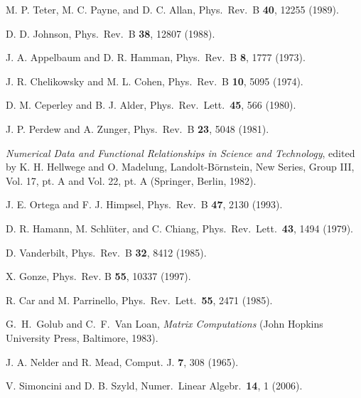 \documentclass[twocolumn,prb,showpacs,superscriptaddress]{revtex4}
\begin{document}
\begin{thebibliography}{99}
M. P. Teter, M. C. Payne, and D. C. Allan,
Phys.\ Rev.\ B {\bf 40}, 12255 (1989).

D. D. Johnson, 
Phys.\ Rev.\ B {\bf 38}, 12807 (1988).

J. A. Appelbaum and D. R. Hamman, 
Phys.\ Rev.\ B {\bf 8}, 1777 (1973).

J. R. Chelikowsky and M. L. Cohen,
Phys.\ Rev.\ B {\bf 10}, 5095 (1974).

D. M. Ceperley and B. J. Alder,
Phys.\ Rev.\ Lett.\ {\bf 45}, 566 (1980).

J. P. Perdew and A. Zunger,
Phys.\ Rev.\ B {\bf 23}, 5048 (1981).

{\it Numerical Data and Functional Relationships in Science and Technology}, 
edited by K. H. Hellwege and O. Madelung, Landolt-B\"ornstein, 
New Series, Group III, Vol. 17, pt. A and Vol. 22, pt. A (Springer, Berlin, 1982).

J. E. Ortega and F. J. Himpsel, 
Phys.\ Rev.\ B {\bf 47}, 2130 (1993).

D. R. Hamann, M. Schl\"uter, and C. Chiang,
Phys.\ Rev.\ Lett.\ {\bf 43}, 1494 (1979).

D. Vanderbilt, 
Phys.\ Rev.\ B {\bf 32}, 8412 (1985).

X. Gonze,
Phys.\ Rev. B {\bf 55}, 10337 (1997).

R. Car and M. Parrinello,
Phys.\ Rev.\ Lett.\ {\bf 55}, 2471 (1985). 

G.\ H.\ Golub and C.\ F.\ Van Loan, {\it Matrix Computations} (John Hopkins University Press, Baltimore, 1983).

J. A. Nelder and R. Mead,
Comput. J. {\bf 7}, 308 (1965).

V. Simoncini and D. B. Szyld,
Numer.\ Linear Algebr.\ {\bf 14}, 1 (2006).

\end{thebibliography}
\end{document}

